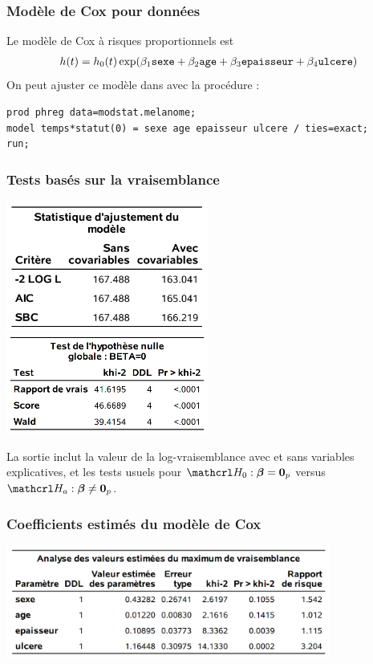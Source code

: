 \documentclass{beamer}
\begin{document}
\begin{frame}[fragile]
\frametitle{Modèle de Cox pour données }
 Le modèle de Cox à risques proportionnels est 
\begin{align*}
h(t) = h_0(t) \exp( \beta_1 \texttt{sexe} + \beta_2 \texttt{age} + \beta_3 \texttt{epaisseur} + \beta_4 \texttt{ulcere})
\end{align*}
 On peut ajuster ce modèle dans \SASlang{} avec la procédure :
\vp \vp
\begin{tcolorbox}[colback=white,colframe=hecblue,title=Code \SASlang{} pour le modèle à risque proportionnel]
{\footnotesize 
\begin{verbatim}
prod phreg data=modstat.melanome;
model temps*statut(0) = sexe age epaisseur ulcere / ties=exact;
run;
\end{verbatim}
}
\end{tcolorbox}
\end{frame}

\begin{frame}
\frametitle{Tests basés sur la vraisemblance}
\vp \vp
\begin{center}
\includegraphics[width = 0.5\textwidth]{img/c7/diapos7e12}
\includegraphics[width = 0.5\textwidth]{img/c7/diapos7e13}
\end{center}
{\footnotesize
La sortie inclut la valeur de la log-vraisemblance avec et sans variables explicatives, et les tests usuels pour $\Hy_0: \bs{\beta}=\bs{0}_p$ versus $\Hy_a: \bs{\beta} \neq \bs{0}_p$.

}
\end{frame}

\begin{frame}
\frametitle{Coefficients estimés du modèle de Cox}
\vp \vp
\begin{center}
\includegraphics[width = 0.8\textwidth]{img/c7/diapos7e14}
\end{center}
% 

\end{frame}
\end{document}
